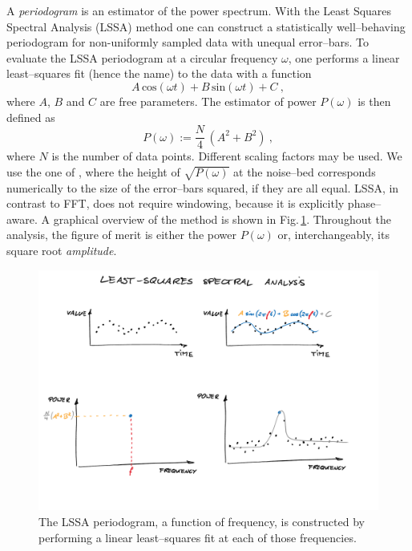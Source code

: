A \emph{periodogram} is an estimator of the power spectrum. With the Least Squares Spectral Analysis (LSSA) method one can construct a statistically well--behaving periodogram for non-uniformly sampled data with unequal error--bars. To evaluate the LSSA periodogram at a circular frequency $\omega$, one performs a linear least--squares fit (hence the name) to the data with a function
\begin{equation}
  A\,\mathrm{cos}(\omega t) + B\,\mathrm{sin}(\omega t) + C \ ,
\end{equation}
where $A$, $B$ and $C$ are free parameters. The estimator of power $P(\omega)$ is then defined as
\begin{equation}
  P(\omega) := \frac{N}{4} \, \left( A^2 + B^2 \right) \ ,
\end{equation}
where $N$ is the number of data points. Different scaling factors may be used. We use the one of \cite{Scargle1982}, where the height of $\sqrt{P(\omega)}$ at the noise--bed corresponds numerically to the size of the error--bars squared, if they are all equal. LSSA, in contrast to FFT, does not require windowing, because it is explicitly phase--aware. A graphical overview of the method is shown in Fig.\,\ref{fig:LSSA}. Throughout the analysis, the figure of merit is either the power $P(\omega)$ or, interchangeably, its square root \emph{amplitude}. 

\begin{figure}[htb]
  \centering \includegraphics[width=\linewidth]{gfx/axions/LSSA}
  \caption{The LSSA periodogram, a function of frequency, is constructed by performing a linear least--squares fit at each of those frequencies.}
  \label{fig:LSSA}
\end{figure}


